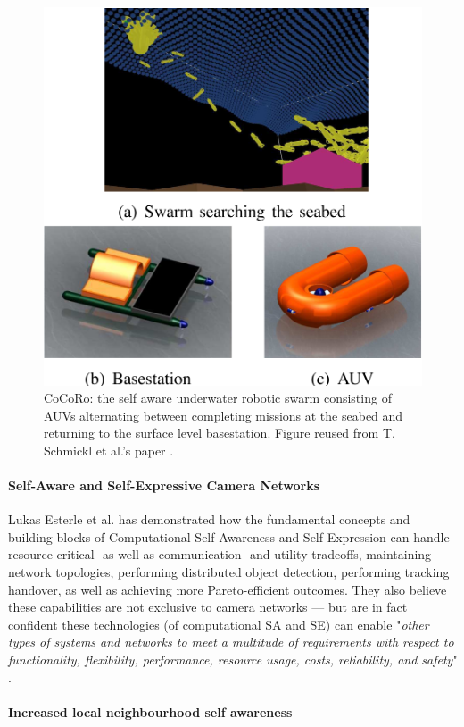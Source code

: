 			\begin{figure}[!ht]
			\centering
			\includegraphics[width=0.65\columnwidth]{Assets/DocSegments/Chapters/Background/Figures/Schema/cocoro.PNG}
			\caption[CoCoRo: the self aware underwater robotic AUV swarm.]{CoCoRo: the self aware underwater robotic swarm consisting of AUVs alternating between completing missions at the seabed and returning to the surface level basestation. Figure reused from T. Schmickl et al.'s paper \cite{cocoro}.}
			\label{fig:cocoro}
			\end{figure}

			\paragraph{Self-Aware and Self-Expressive Camera Networks \nl}

			Lukas Esterle et al. \cite{sa_and_se_camera_networks} has demonstrated how the fundamental concepts and building blocks of Computational Self-Awareness and Self-Expression can handle resource-critical- as well as communication- and utility-tradeoffs, maintaining network topologies, performing distributed object detection, performing tracking handover, as well as achieving more Pareto-efficient outcomes. They also believe these capabilities are not exclusive to camera networks — but are in fact confident these technologies (of computational SA and SE) can enable "\textit{other types of systems and networks to meet a multitude of requirements with respect to functionality, flexibility, performance, resource usage, costs, reliability, and safety}" \cite{sa_and_se_camera_networks}.
			
			
			\paragraph{Increased local neighbourhood self awareness}
			
